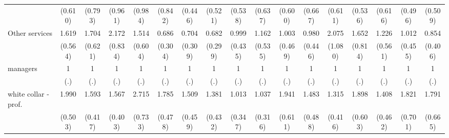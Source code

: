 {\begin{tabular}{l*{16}{c}}
                    &     (0.610)         &     (0.793)         &     (0.961)         &     (0.984)         &     (0.842)         &     (0.446)         &     (0.521)         &     (0.538)         &     (0.637)         &     (0.600)         &     (0.667)         &     (0.611)         &     (0.536)         &     (0.616)         &     (0.496)         &     (0.509)         \\
[1em]
Other services      &       1.619         &       1.704         &       2.172\sym{*}  &       1.514         &       0.686         &       0.704         &       0.682         &       0.999         &       1.162         &       1.003         &       0.980         &       2.075         &       1.652         &       1.226         &       1.012         &       0.854         \\
                    &     (0.564)         &     (0.621)         &     (0.834)         &     (0.604)         &     (0.304)         &     (0.309)         &     (0.299)         &     (0.435)         &     (0.535)         &     (0.469)         &     (0.446)         &     (1.080)         &     (0.814)         &     (0.561)         &     (0.455)         &     (0.406)         \\
[1em]
managers            &           1         &           1         &           1         &           1         &           1         &           1         &           1         &           1         &           1         &           1         &           1         &           1         &           1         &           1         &           1         &           1         \\
                    &         (.)         &         (.)         &         (.)         &         (.)         &         (.)         &         (.)         &         (.)         &         (.)         &         (.)         &         (.)         &         (.)         &         (.)         &         (.)         &         (.)         &         (.)         &         (.)         \\
[1em]
white collar - prof.&       1.990\sym{**} &       1.593         &       1.567         &       2.715\sym{***}&       1.785\sym{*}  &       1.509         &       1.381         &       1.013         &       1.037         &       1.941\sym{*}  &       1.483         &       1.315         &       1.898\sym{*}  &       1.408         &       1.821         &       1.791         \\
                    &     (0.503)         &     (0.417)         &     (0.403)         &     (0.733)         &     (0.478)         &     (0.459)         &     (0.432)         &     (0.347)         &     (0.316)         &     (0.611)         &     (0.488)         &     (0.416)         &     (0.603)         &     (0.462)         &     (0.701)         &     (0.665)         \\

\end{tabular}}
